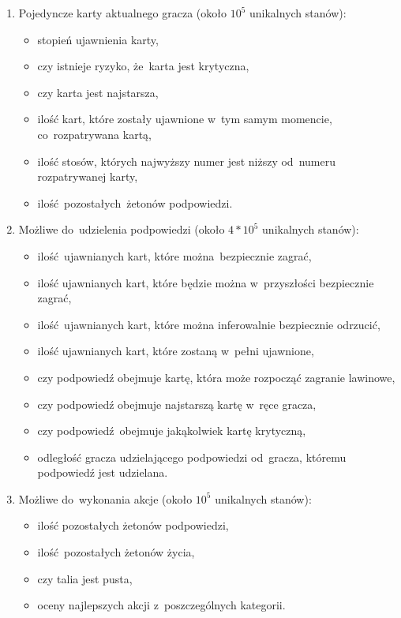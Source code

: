 \documentclass[declaration,shortabstract,inz]{iithesis}
\begin{document}
\begin{enumerate}
	\item Pojedyncze karty aktualnego gracza (około $10^5$ unikalnych stanów):
		\begin{itemize}
			\item stopień ujawnienia karty,
			\item czy istnieje ryzyko, że~karta jest krytyczna,
			\item czy karta jest najstarsza,
			\item ilość kart, które zostały ujawnione w~tym samym momencie, co~rozpatrywana kartą,
			\item ilość stosów, których najwyższy numer jest niższy od~numeru rozpatrywanej karty,
			\item ilość pozostałych żetonów podpowiedzi.
		\end{itemize}
	\item Możliwe do~udzielenia podpowiedzi (około $4*10^5$ unikalnych stanów):
		\begin{itemize}
			\item ilość ujawnianych kart, które można bezpiecznie zagrać,
			\item ilość ujawnianych kart, które będzie można w~przyszłości bezpiecznie zagrać,
			\item ilość ujawnianych kart, które można inferowalnie bezpiecznie odrzucić,
			\item ilość ujawnianych kart, które zostaną w~pełni ujawnione,
			\item czy podpowiedź obejmuje kartę, która może rozpocząć zagranie lawinowe,
			\item czy podpowiedź obejmuje najstarszą kartę w~ręce gracza,
			\item czy podpowiedź obejmuje jakąkolwiek kartę krytyczną,
			\item odległość gracza udzielającego podpowiedzi od~gracza, któremu podpowiedź jest udzielana.
		\end{itemize}
	\item Możliwe do~wykonania akcje (około $10^5$ unikalnych stanów):
		\begin{itemize}
			\item ilość pozostałych żetonów podpowiedzi,
			\item ilość pozostałych żetonów życia,
			\item czy talia jest pusta,
			\item oceny najlepszych akcji z~poszczególnych kategorii.
		\end{itemize}
\end{enumerate}
\end{document}
